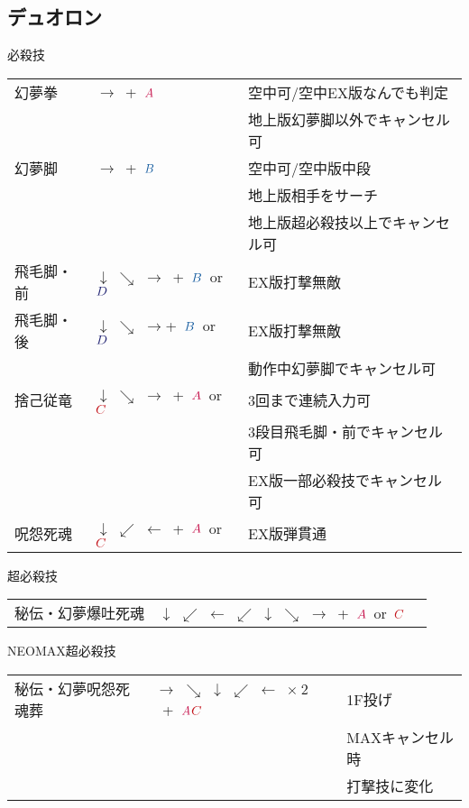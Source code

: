 \documentclass[a4j,11pt]{jarticle}
\def\A{$\textcolor{Acolor}{A}$}
\def\C{$\textcolor{Ccolor}{C}$}
\def\B{$\textcolor{Bcolor}{B}$}
\def\D{$\textcolor{Dcolor}{D}$}
\def\hado{$\downarrow$ $\searrow$ $\rightarrow$}%
\def\tatsu{$\downarrow$ $\swarrow$ $\leftarrow$}%
\def\gyakuyoga{$\rightarrow$ $\searrow$ $\downarrow$ $\swarrow$ $\leftarrow$}%
\def\orochi{$\downarrow$ $\swarrow$ $\leftarrow$ $\swarrow$ $\downarrow$ $\searrow$ $\rightarrow$}%
\begin{document}
\subsection{デュオロン}
\begin{itembox}[l]{必殺技}
\begin{tabular}{lll}
幻夢拳&$\rightarrow$\ +\ \A&空中可/空中EX版なんでも判定\\%
&&地上版幻夢脚以外でキャンセル可\\
幻夢脚&$\rightarrow$\ +\ \B&空中可/空中版中段\\%
&&地上版相手をサーチ\\
&&地上版超必殺技以上でキャンセル可\\
飛毛脚・前&\hado\ +\ \B\ or\ \D&EX版打撃無敵\\%
飛毛脚・後&\hado +\ \B\ or\ \D&EX版打撃無敵\\%
&&動作中幻夢脚でキャンセル可\\
捨己従竜&\hado\ +\ \A\ or\ \C&3回まで連続入力可\\%
&&3段目飛毛脚・前でキャンセル可\\
&&EX版一部必殺技でキャンセル可\\
呪怨死魂&\tatsu\ +\ \A\ or\ \C&EX版弾貫通%
\end{tabular}
\end{itembox}
\begin{itembox}[l]{超必殺技}
\begin{tabular}{lll}
秘伝・幻夢爆吐死魂&\orochi\ +\ \A\ or\ \C&%
\end{tabular}
\end{itembox}
\begin{itembox}[l]{NEOMAX超必殺技}
\begin{tabular}{lll}
秘伝・幻夢呪怨死魂葬&\gyakuyoga\ $\times\ 2$\ +\ \A\C&1F投げ\\%
&&MAXキャンセル時\\
&&打撃技に変化
\end{tabular}
\end{itembox}
\newpage
\end{document}
